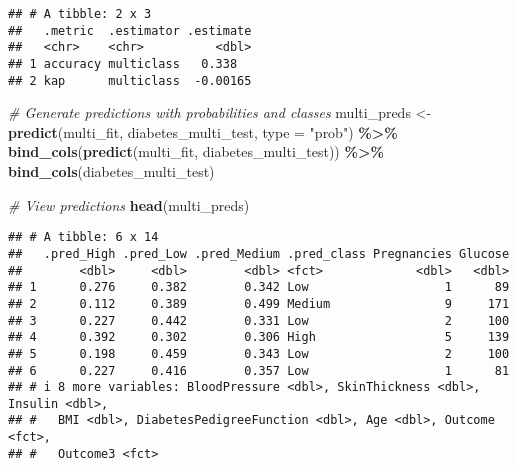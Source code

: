 \documentclass[
]{article}
\newenvironment{Shaded}{\begin{snugshade}}{\end{snugshade}}
\newcommand{\AttributeTok}[1]{\textcolor[rgb]{0.13,0.29,0.53}{#1}}
\newcommand{\CommentTok}[1]{\textcolor[rgb]{0.56,0.35,0.01}{\textit{#1}}}
\newcommand{\FunctionTok}[1]{\textcolor[rgb]{0.13,0.29,0.53}{\textbf{#1}}}
\newcommand{\NormalTok}[1]{#1}
\newcommand{\OtherTok}[1]{\textcolor[rgb]{0.56,0.35,0.01}{#1}}
\newcommand{\SpecialCharTok}[1]{\textcolor[rgb]{0.81,0.36,0.00}{\textbf{#1}}}
\newcommand{\StringTok}[1]{\textcolor[rgb]{0.31,0.60,0.02}{#1}}
\begin{document}
\begin{verbatim}
## # A tibble: 2 x 3
##   .metric  .estimator .estimate
##   <chr>    <chr>          <dbl>
## 1 accuracy multiclass   0.338  
## 2 kap      multiclass  -0.00165
\end{verbatim}

\begin{Shaded}
\begin{Highlighting}[]
\CommentTok{\# Generate predictions with probabilities and classes}
\NormalTok{multi\_preds }\OtherTok{\textless{}{-}} \FunctionTok{predict}\NormalTok{(multi\_fit, diabetes\_multi\_test, }\AttributeTok{type =} \StringTok{"prob"}\NormalTok{) }\SpecialCharTok{\%\textgreater{}\%}
  \FunctionTok{bind\_cols}\NormalTok{(}\FunctionTok{predict}\NormalTok{(multi\_fit, diabetes\_multi\_test)) }\SpecialCharTok{\%\textgreater{}\%}
  \FunctionTok{bind\_cols}\NormalTok{(diabetes\_multi\_test)}

\CommentTok{\# View predictions}
\FunctionTok{head}\NormalTok{(multi\_preds)}
\end{Highlighting}
\end{Shaded}

\begin{verbatim}
## # A tibble: 6 x 14
##   .pred_High .pred_Low .pred_Medium .pred_class Pregnancies Glucose
##        <dbl>     <dbl>        <dbl> <fct>             <dbl>   <dbl>
## 1      0.276     0.382        0.342 Low                   1      89
## 2      0.112     0.389        0.499 Medium                9     171
## 3      0.227     0.442        0.331 Low                   2     100
## 4      0.392     0.302        0.306 High                  5     139
## 5      0.198     0.459        0.343 Low                   2     100
## 6      0.227     0.416        0.357 Low                   1      81
## # i 8 more variables: BloodPressure <dbl>, SkinThickness <dbl>, Insulin <dbl>,
## #   BMI <dbl>, DiabetesPedigreeFunction <dbl>, Age <dbl>, Outcome <fct>,
## #   Outcome3 <fct>
\end{verbatim}
\end{document}
